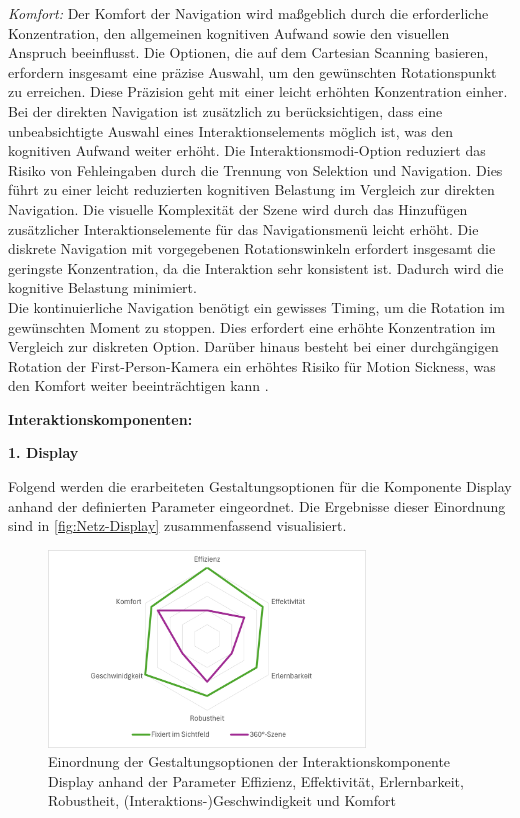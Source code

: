 \textit{Komfort:}
Der Komfort der Navigation wird maßgeblich durch die erforderliche Konzentration, den allgemeinen kognitiven Aufwand sowie den visuellen Anspruch beeinflusst. Die Optionen, die auf dem Cartesian Scanning basieren, erfordern insgesamt eine präzise Auswahl, um den gewünschten Rotationspunkt zu erreichen. Diese Präzision geht mit einer leicht erhöhten Konzentration einher. Bei der direkten Navigation ist zusätzlich zu berücksichtigen, dass eine unbeabsichtigte Auswahl eines Interaktionselements möglich ist, was den kognitiven Aufwand weiter erhöht. Die Interaktionsmodi-Option reduziert das Risiko von Fehleingaben durch die Trennung von Selektion und Navigation. Dies führt zu einer leicht reduzierten kognitiven Belastung im Vergleich zur direkten Navigation. Die visuelle Komplexität der Szene wird durch das Hinzufügen zusätzlicher Interaktionselemente für das Navigationsmenü leicht erhöht. Die diskrete Navigation mit vorgegebenen Rotationswinkeln erfordert insgesamt die geringste Konzentration, da die Interaktion sehr konsistent ist. Dadurch wird die kognitive Belastung minimiert.\\
Die kontinuierliche Navigation benötigt ein gewisses Timing, um die Rotation im gewünschten Moment zu stoppen. Dies erfordert eine erhöhte Konzentration im Vergleich zur diskreten Option. Darüber hinaus besteht bei einer durchgängigen Rotation der First-Person-Kamera ein erhöhtes Risiko für Motion Sickness, was den Komfort weiter beeinträchtigen kann \citep{10.1007/s10055-020-00425-x, 8797722}.


{\normalfont \bfseries Interaktionskomponenten:} 

\textbf{1. Display}

Folgend werden die erarbeiteten Gestaltungsoptionen für die Komponente Display anhand der definierten Parameter eingeordnet. Die Ergebnisse dieser Einordnung sind in \autoref{fig:Netz-Display} zusammenfassend visualisiert.

\begin{figure}[tbh]
    \centering
    \includegraphics[width=0.75\textwidth]{images/Netzdiagramm-Display.png}
    \caption{Einordnung der Gestaltungsoptionen der Interaktionskomponente Display anhand der Parameter Effizienz, Effektivität, Erlernbarkeit, Robustheit, (Interaktions-)Geschwindigkeit und Komfort}
    \label{fig:Netz-Display}
\end{figure}

